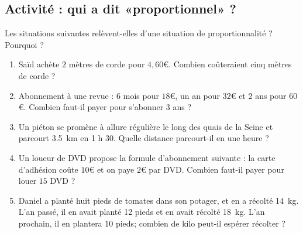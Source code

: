 
\subsection*{Activité : qui a dit «proportionnel» ?}

Les situations suivantes relèvent-elles d’une situation de proportionnalité ? Pourquoi ?
\begin{enumerate}
    \item

 Saïd achète $2$ mètres de corde pour $4,60$€. Combien coûteraient cinq mètres de corde ?


\item
 Abonnement à une revue : \( 6\) mois pour \( 18\)€, un an pour \( 32\)€ et \( 2\) ans pour \( 60\)€. Combien faut-il payer pour s'abonner \( 3\) ans ?
\item
    Un piéton se promène à allure régulière le long des quais de la Seine et parcourt \SI{3.5}{\kilo\meter} en 1 h 30. Quelle distance parcourt-il en une heure ?
\item

 Un loueur de DVD propose la formule d'abonnement suivante : la carte d'adhésion coûte $10$€ et on paye $2$€ par DVD. Combien faut-il payer pour louer \( 15\) DVD ?

\item
    Daniel a planté huit pieds de tomates dans son potager, et en a récolté \SI{14}{\kilo\gram}. L'an passé, il en avait planté 12 pieds et en avait récolté \SI{18}{\kilo\gram}. L'an prochain, il en plantera 10 pieds; combien de kilo peut-il espérer récolter ?
\end{enumerate}
